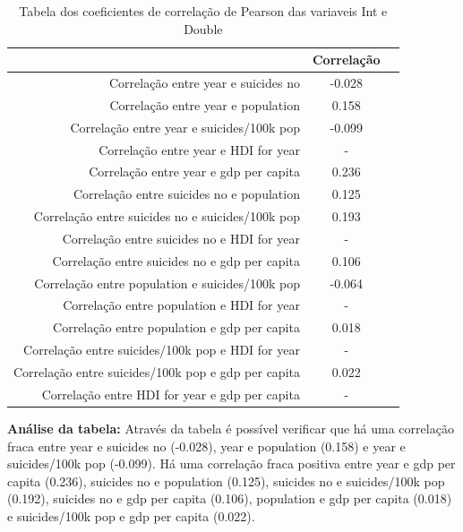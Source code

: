 \documentclass{article}
\begin{document}
\begin{table}[h]
\begin{center}
\begin{tabular}{|r|c|c|}
\hline
&Correlação\\ \hline
Correlação entre year e suicides no & -0.028\\ \hline
Correlação entre year e population & 0.158 \\ \hline
Correlação entre year e suicides/100k pop & -0.099 \\ \hline
Correlação entre year e HDI for year & -  \\ \hline
Correlação entre year e gdp per capita   & 0.236 \\ \hline
Correlação entre suicides no e population & 0.125 \\ \hline
Correlação entre suicides no e suicides/100k pop & 0.193 \\ \hline
Correlação entre suicides no e HDI for year & - \\ \hline
Correlação entre suicides no e gdp per capita  & 0.106 \\ \hline
Correlação entre population e suicides/100k pop & -0.064 \\ \hline
Correlação entre population e HDI for year & - \\ \hline
Correlação entre population e gdp per capita  & 0.018 \\ \hline
Correlação entre suicides/100k pop e HDI for year & - \\ \hline
Correlação entre suicides/100k pop e gdp per capita  & 0.022 \\ \hline
Correlação entre HDI for year e gdp per capita  & - \\ \hline

\end{tabular}
\end{center}
\caption{Tabela dos coeficientes de correlação de Pearson das variaveis Int e Double}
\label{tab:tabela_exemplo}
\end{table}

\textbf{Análise da tabela:}
\newline
Através da tabela é possível verificar que há uma correlação fraca entre year e suicides no (-0.028), year e population (0.158) e year e suicides/100k pop (-0.099). Há uma correlação fraca positiva entre year e gdp per capita (0.236), suicides no e population (0.125), suicides no e suicides/100k pop (0.192), suicides no e gdp per capita (0.106), population e gdp per capita (0.018) e suicides/100k pop e gdp per capita (0.022).
\end{document}
